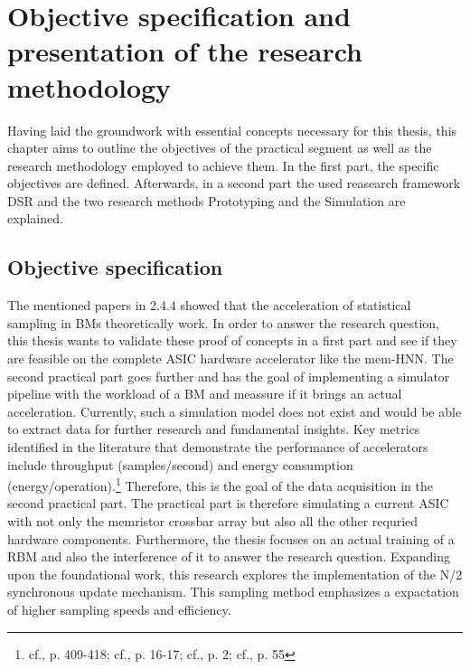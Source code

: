 \chapter{Objective specification and presentation of the research methodology}

Having laid the groundwork with essential concepts necessary for this thesis,
this chapter aims to outline the objectives of the practical segment as well as the research methodology employed to achieve them.
In the first part, the specific objectives are defined. 
Afterwards, in a second part the used reasearch framework \ac{DSR} and the two research methods Prototyping and the Simulation are explained.

\section{Objective specification}
The mentioned papers in 2.4.4 showed that the acceleration of statistical sampling in \ac{BM}s theoretically work. 
In order to answer the research question, this thesis wants to validate these proof of concepts in a first part and see if they are feasible on the complete \ac{ASIC} hardware accelerator like the \ac{mem-HNN}. 
The second practical part goes further and has the goal of implementing a simulator pipeline with the workload of a \ac{BM}
and meassure if it brings an actual acceleration. 
Currently, such a simulation model does not exist and would be able to extract data for further research and fundamental insights.  
Key metrics identified in the literature that demonstrate the performance of accelerators include throughput (samples/second) and energy consumption (energy/operation).\footnote{cf.\cite{caiPowerefficientCombinatorialOptimization2020}, p. 409-418; cf.\cite{ortega-zamoranoFPGAHardwareAcceleration2016}, p. 16-17; cf.\cite{aaditAcceleratingAdaptiveParallel2023}, p. 2; cf.\cite{bellettiJanusFPGABasedSystem2009}, p. 55}
Therefore, this is the goal of the data acquisition in the second practical part.
The practical part is therefore simulating a current \ac{ASIC} with not only the memristor crossbar array but also all the other requried hardware components.
Furthermore, the thesis focuses on an actual training of a \ac{RBM} and also the interference of it to answer the research question.
Expanding upon the foundational work, this research explores the implementation of the N/2 synchronous update mechanism.
This sampling method emphasizes a expactation of higher sampling speeds and efficiency.

